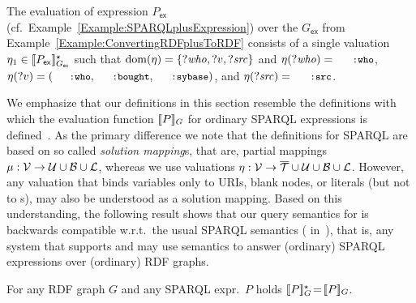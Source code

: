\begin{example} \label{Example:SPARQLplusEvaluation}
	The evaluation of {\SPARQLplus} expression $P_\mathsf{ex}$ (cf.~Example~\ref{Example:SPARQLplusExpression}) over the {\RDFplusGraph} $G_\mathsf{ex}$ from Example~\ref{Example:ConvertingRDFplusToRDF} consists of a single valuation
		$\eta_1 \in [\![P_\mathsf{ex}]\!]^\star_{G_\mathsf{ex}}$
	such that $\mathrm{dom}(\eta) = \lbrace ?\mathit{who}, ?v, ?\mathit{src} \rbrace$ and $\eta(?\mathit{who})=\mathTinyRDF{:who}$, $\eta(?v)=(\mathTinyRDF{:who},\mathTinyRDF{:bought},\mathTinyRDF{:sybase})$, and $\eta(?\mathit{src})=\mathTinyRDF{:src}$.
\end{example}

\noindent
% 
We emphasize that our definitions in this section resemble the definitions with which
the evaluation function
	$[\![P]\!]_{G}$
for ordinary SPARQL
	expressions is defined~\cite{Perez09:SemanticsAndComplexityOfSPARQL}.
As the primary difference we note that the definitions for SPARQL are based on so called \emph{solution mapping}s, that are, partial mappings $\mu : \mathcal{V} \rightarrow \mathcal{U} \cup \mathcal{B} \cup \mathcal{L}$, whereas we use valuations $\eta : \mathcal{V} \rightarrow \overline{\mathcal{T}} \cup \mathcal{U} \cup \mathcal{B} \cup \mathcal{L}$. However, any valuation
	that binds variables only to URIs, blank nodes, or literals (but not to {\RDFplusTriple}s),
may also be understood as a solution mapping. Based on this understanding, the following result shows that our query semantics for {\SPARQLplus} is backwards compatible w.r.t.~the usual SPARQL semantics (%
in~\cite{Perez09:SemanticsAndComplexityOfSPARQL}), that is, any system that supports {\RDFplus} and {\SPARQLplus} may use {\SPARQLplus} semantics to answer (ordinary) SPARQL expressions over (ordinary) RDF graphs.

\begin{proposition} \label{Proposition:EquivalenceOfSemantics}
	For any
	RDF graph $G$ and any
	SPARQL
		expr.~$P$
	holds $[\![P]\!]^\star_{G} \!=\! [\![P]\!]_{G}$.
\end{proposition}

